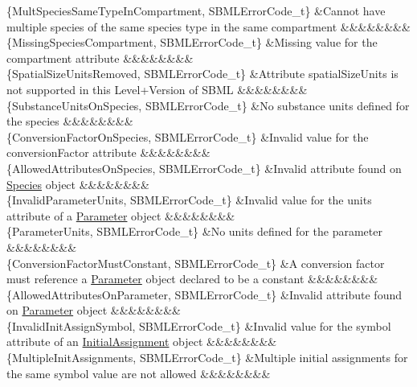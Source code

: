 \begin{DoxyParagraph}{}
\begin{longtabu}
\{Mult\+Species\+Same\+Type\+In\+Compartment, S\+B\+M\+L\+Error\+Code\+\_\+t\} &Cannot have multiple species of the same species type in the same compartment &&&&&&&&\\
\{Missing\+Species\+Compartment, S\+B\+M\+L\+Error\+Code\+\_\+t\} &Missing value for the \textquotesingle{}compartment\textquotesingle{} attribute &&&&&&&&\\
\{Spatial\+Size\+Units\+Removed, S\+B\+M\+L\+Error\+Code\+\_\+t\} &Attribute \textquotesingle{}spatial\+Size\+Units\textquotesingle{} is not supported in this Level+\+Version of S\+B\+ML &&&&&&&&\\
\{Substance\+Units\+On\+Species, S\+B\+M\+L\+Error\+Code\+\_\+t\} &No substance units defined for the species &&&&&&&&\\
\{Conversion\+Factor\+On\+Species, S\+B\+M\+L\+Error\+Code\+\_\+t\} &Invalid value for the \textquotesingle{}conversion\+Factor\textquotesingle{} attribute &&&&&&&&\\
\{Allowed\+Attributes\+On\+Species, S\+B\+M\+L\+Error\+Code\+\_\+t\} &Invalid attribute found on \hyperlink{class_species}{Species} object &&&&&&&&\\
\{Invalid\+Parameter\+Units, S\+B\+M\+L\+Error\+Code\+\_\+t\} &Invalid value for the \textquotesingle{}units\textquotesingle{} attribute of a \hyperlink{class_parameter}{Parameter} object &&&&&&&&\\
\{Parameter\+Units, S\+B\+M\+L\+Error\+Code\+\_\+t\} &No units defined for the parameter &&&&&&&&\\
\{Conversion\+Factor\+Must\+Constant, S\+B\+M\+L\+Error\+Code\+\_\+t\} &A conversion factor must reference a \hyperlink{class_parameter}{Parameter} object declared to be a constant &&&&&&&&\\
\{Allowed\+Attributes\+On\+Parameter, S\+B\+M\+L\+Error\+Code\+\_\+t\} &Invalid attribute found on \hyperlink{class_parameter}{Parameter} object &&&&&&&&\\
\{Invalid\+Init\+Assign\+Symbol, S\+B\+M\+L\+Error\+Code\+\_\+t\} &Invalid value for the \textquotesingle{}symbol\textquotesingle{} attribute of an \hyperlink{class_initial_assignment}{Initial\+Assignment} object &&&&&&&&\\
\{Multiple\+Init\+Assignments, S\+B\+M\+L\+Error\+Code\+\_\+t\} &Multiple initial assignments for the same \textquotesingle{}symbol\textquotesingle{} value are not allowed &&&&&&&&\\

\end{longtabu}
\end{DoxyParagraph}
